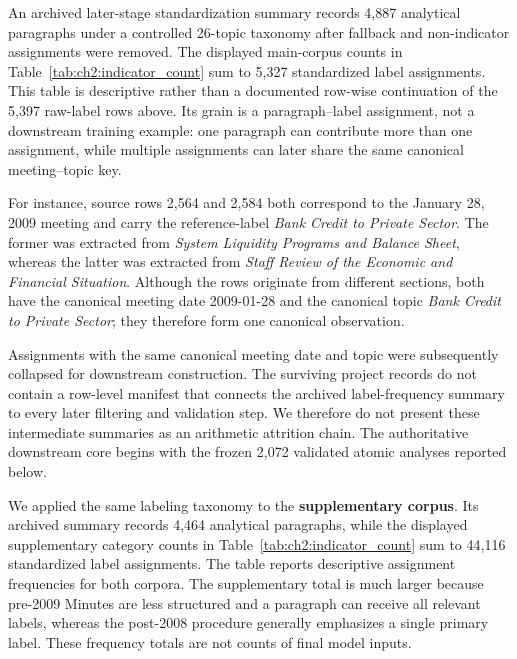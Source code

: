 


An archived later-stage standardization summary records 4,887 analytical
paragraphs under a controlled 26-topic taxonomy after fallback and
non-indicator assignments were removed. The displayed main-corpus counts in
Table~\ref{tab:ch2:indicator_count} sum to 5,327 standardized label
assignments. This table is descriptive rather than a documented row-wise
continuation of the 5,397 raw-label rows above. Its grain is a paragraph--label
assignment, not a downstream training example: one paragraph can contribute
more than one assignment, while multiple assignments can later share the same
canonical meeting--topic key.

 

For instance, source rows 2,564 and 2,584 both correspond to the January 28,
2009 meeting and carry the reference-label \textit{Bank Credit to Private Sector}.
The former was extracted from \textit{System Liquidity Programs and Balance
Sheet}, whereas the latter was extracted from \textit{Staff Review of the
Economic and Financial Situation}.  Although the rows originate from different
sections, both have the canonical meeting date 2009-01-28 and the canonical
topic \textit{Bank Credit to Private Sector}; they therefore form one canonical
observation.

Assignments with the same canonical meeting date and topic were subsequently
collapsed for downstream construction. The surviving project records do not
contain a row-level manifest that connects the archived label-frequency
summary to every later filtering and validation step. We therefore do not
present these intermediate summaries as an arithmetic attrition chain. The
authoritative downstream core begins with the frozen 2,072 validated atomic
analyses reported below.


We applied the same labeling taxonomy to the \textbf{supplementary corpus}.
Its archived summary records 4,464 analytical paragraphs, while the displayed
supplementary category counts in Table~\ref{tab:ch2:indicator_count} sum to
44,116 standardized label assignments. The table reports descriptive
assignment frequencies for both corpora. The
supplementary total is much larger because pre-2009 Minutes are less
structured and a paragraph can receive all relevant labels, whereas the
post-2008 procedure generally emphasizes a single primary label. These
frequency totals are not counts of final model inputs.



